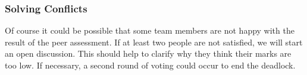 \documentclass[10pt]{scrartcl}
\begin{document}
\subsubsection{Solving Conflicts}

Of course it could be possible that some team members are not happy with the result of the peer assessment. If at least two people are not satisfied, we will start an open discussion. This should help to clarify why they think their marks are too low.  If necessary, a second round of voting could occur to end the deadlock.
\end{document}

